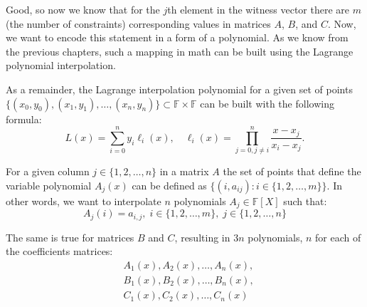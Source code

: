 \documentclass[../lecture-notes.tex]{subfiles}
\begin{document}
\begin{example}
\begin{center}
    \end{center}
\end{example}

Good, so now we know that for the $j$th element in the witness vector there are $m$ (the number of constraints) corresponding values in matrices $A$, $B$, and $C$. Now, we want to encode this statement in a form of a polynomial. 
As we know from the previous chapters, such a mapping in math can be built using the Lagrange polynomial interpolation.

\begin{remark}
    As a remainder, the Lagrange interpolation polynomial for a given set of points 
    $\{(x_0,y_0),(x_1,y_1),\dots,(x_n,y_n)\} \subset \mathbb{F} \times \mathbb{F}$
    can be built with the following formula:
    \begin{equation*}
        L(x) = \sum_{i=0}^{n} y_i \ell_i(x), \quad \ell_i(x) = \prod_{j=0, j \neq i}^{n} \frac{x-x_j}{x_i-x_j}.
    \end{equation*}  
\end{remark}

For a given column $j \in \{1, 2, \dots, n\}$ in a matrix $A$ the set of points that define the
variable polynomial $A_j(x)$ can be defined as $\{(i, a_{ij}): i \in \{1, 2, \dots, m\}\}$. In other words,
we want to interpolate $n$ polynomials $A_j \in \mathbb{F}[X]$ such that:
\begin{equation*}
    A_j(i) = a_{i,j}, \; i \in \{1,2,\dots,m\}, \; j \in \{1,2,\dots,n\}
\end{equation*}

The same is true for matrices $B$ and $C$, resulting in $3n$ polynomials, $n$ for each of the
coefficients matrices:
\begin{align*}
    &A_1(x), A_2(x), \dots, A_n(x), \\
    &B_1(x), B_2(x), \dots, B_n(x), \\
    &C_1(x), C_2(x), \dots, C_n(x)
\end{align*}
\end{document}
